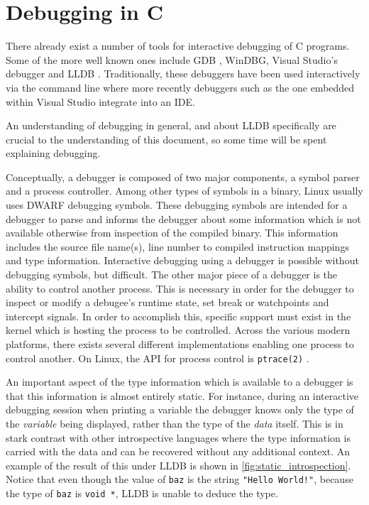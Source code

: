 \documentclass{report}
\begin{document}
\section{Debugging in C}
There already exist a number of tools for interactive debugging of C programs.
Some of the more well known ones include GDB \autocite{gdb}, WinDBG, Visual
Studio's debugger and LLDB \autocite{lldb}. Traditionally, these debuggers have
been used interactively via the command line where more recently debuggers such
as the one embedded within Visual Studio integrate into an IDE.

An understanding of debugging in general, and about LLDB specifically are
crucial to the understanding of this document, so some time will be spent
explaining debugging.

Conceptually, a debugger is composed of two major components, a symbol parser and a
process controller. Among other types of symbols in a binary, Linux usually uses
DWARF \autocite{dwarf} debugging symbols. These debugging symbols are intended for a
debugger to parse and informs the debugger about some information which is not
available otherwise from inspection of the compiled binary. This information
includes the source file name(s), line number to compiled instruction mappings
and type information. Interactive debugging using a debugger is possible without
debugging symbols, but difficult. The other major piece of a debugger is the
ability to control another process. This is necessary in order for the debugger
to inspect or modify a debugee's runtime state, set break or watchpoints and
intercept signals. In order to accomplish this, specific support must exist in
the kernel which is hosting the process to be controlled. Across the various
modern platforms, there exists several different implementations enabling one
process to control another. On Linux, the API for process control is
\lstinline|ptrace(2)| \autocite{ptrace}.

An important aspect of the type information which is available to a debugger is
that this information is almost entirely static. For instance, during an
interactive debugging session when printing a variable the debugger knows only
the type of the \emph{variable} being displayed, rather than the type of the
\emph{data} itself. This is in stark contrast with other introspective
languages where the type information is carried with the data and can be
recovered without any additional context. An example of the result of this under
LLDB is shown in \cref{fig:static_introspection}. Notice that even though the
value of \lstinline|baz| is the string \lstinline|"Hello World!"|, because the
type of \lstinline|baz| is \lstinline|void *|, LLDB is unable to deduce the
type.
\end{document}
